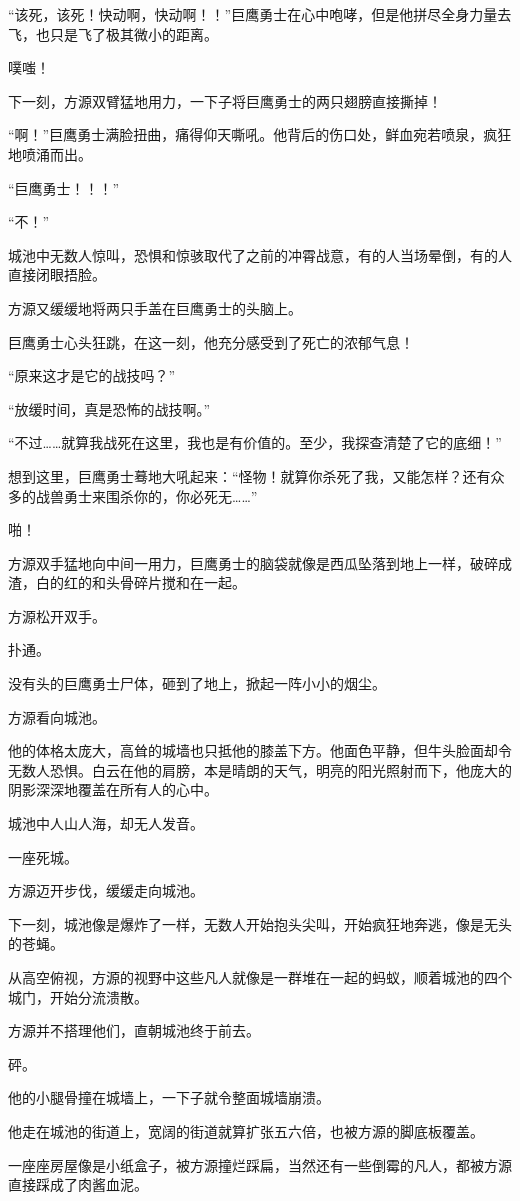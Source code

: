 \begin{this_body}
“该死，该死！快动啊，快动啊！！”巨鹰勇士在心中咆哮，但是他拼尽全身力量去飞，也只是飞了极其微小的距离。

噗嗤！

下一刻，方源双臂猛地用力，一下子将巨鹰勇士的两只翅膀直接撕掉！

“啊！”巨鹰勇士满脸扭曲，痛得仰天嘶吼。他背后的伤口处，鲜血宛若喷泉，疯狂地喷涌而出。

“巨鹰勇士！！！”

“不！”

城池中无数人惊叫，恐惧和惊骇取代了之前的冲霄战意，有的人当场晕倒，有的人直接闭眼捂脸。

方源又缓缓地将两只手盖在巨鹰勇士的头脑上。

巨鹰勇士心头狂跳，在这一刻，他充分感受到了死亡的浓郁气息！

“原来这才是它的战技吗？”

“放缓时间，真是恐怖的战技啊。”

“不过……就算我战死在这里，我也是有价值的。至少，我探查清楚了它的底细！”

想到这里，巨鹰勇士蓦地大吼起来：“怪物！就算你杀死了我，又能怎样？还有众多的战兽勇士来围杀你的，你必死无……”

啪！

方源双手猛地向中间一用力，巨鹰勇士的脑袋就像是西瓜坠落到地上一样，破碎成渣，白的红的和头骨碎片搅和在一起。

方源松开双手。

扑通。

没有头的巨鹰勇士尸体，砸到了地上，掀起一阵小小的烟尘。

方源看向城池。

他的体格太庞大，高耸的城墙也只抵他的膝盖下方。他面色平静，但牛头脸面却令无数人恐惧。白云在他的肩膀，本是晴朗的天气，明亮的阳光照射而下，他庞大的阴影深深地覆盖在所有人的心中。

城池中人山人海，却无人发音。

一座死城。

方源迈开步伐，缓缓走向城池。

下一刻，城池像是爆炸了一样，无数人开始抱头尖叫，开始疯狂地奔逃，像是无头的苍蝇。

从高空俯视，方源的视野中这些凡人就像是一群堆在一起的蚂蚁，顺着城池的四个城门，开始分流溃散。

方源并不搭理他们，直朝城池终于前去。

砰。

他的小腿骨撞在城墙上，一下子就令整面城墙崩溃。

他走在城池的街道上，宽阔的街道就算扩张五六倍，也被方源的脚底板覆盖。

一座座房屋像是小纸盒子，被方源撞烂踩扁，当然还有一些倒霉的凡人，都被方源直接踩成了肉酱血泥。

\end{this_body}


